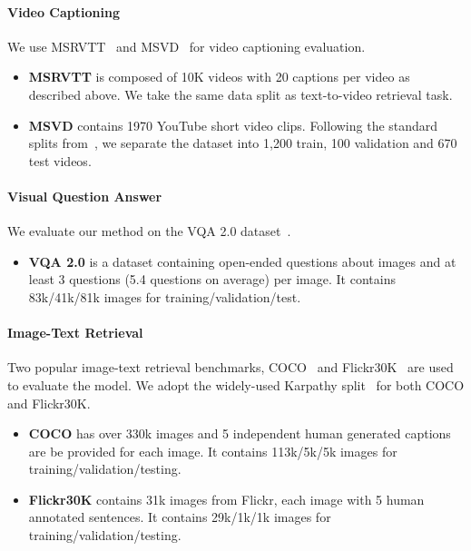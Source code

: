 \documentclass{article}
\theoremstyle{plain}
\theoremstyle{definition}
\theoremstyle{remark}
\begin{document}
\paragraph{Video Captioning}
We use MSRVTT~\citep{xu2016msrvtt} and MSVD~\citep{chen2011msvd} for video captioning evaluation.

\begin{itemize}
    \item \textbf{MSRVTT} is composed of 10K videos with 20 captions per video as described above. We take the same data split as text-to-video retrieval task. 
    \item \textbf{MSVD} contains 1970 YouTube short video clips. 
    Following the standard splits from~\citep{lin2022swinbert, li2022lavender}, we separate the dataset into 1,200 train, 100 validation and 670 test videos.
\end{itemize}

\paragraph{Visual Question Answer}
We evaluate our method on the VQA 2.0 dataset~\citep{vqa}.

\begin{itemize}
    \item \textbf{VQA 2.0} is a dataset containing open-ended questions about images and at least 3 questions (5.4 questions on average) per image. It contains 83k/41k/81k images for training/validation/test.
\end{itemize} 



\paragraph{Image-Text Retrieval}
Two popular image-text retrieval benchmarks, COCO~\citep{lin2014microsoft} and Flickr30K~\citep{plummer2015flickr30k} are used to evaluate the model. We adopt the widely-used Karpathy split~\citep{karpathy2015deep} for both COCO and Flickr30K.
\begin{itemize}
    \item \textbf{COCO} has over 330k images and 5 independent human generated captions are be provided for each image. It contains 113k/5k/5k images for training/validation/testing.

    \item \textbf{Flickr30K} contains 31k images from Flickr, each image with 5 human annotated sentences. It contains 29k/1k/1k images for training/validation/testing.
\end{itemize}
    
\end{document}
